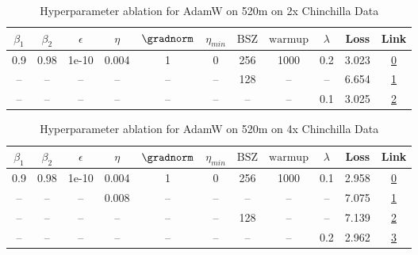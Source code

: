 \begin{table}[H]
\centering
\caption{Hyperparameter ablation for AdamW on 520m on 2x Chinchilla Data}
\label{tab:ablation_adamw_520m_on_2x_chinchilla_data}
\begin{tabular}{ccccccccccc}
\toprule
$\beta_1$ & $\beta_2$ & $\epsilon$ & $\eta$ & $\gradnorm$ & $\eta_{min}$ & $\mathrm{BSZ}$ & $\mathrm{warmup}$ & $\lambda$ & Loss & Link \\
\midrule
0.9 & 0.98 & 1e-10 & 0.004 & 1 & 0 & 256 & 1000 & 0.2 & 3.023 & \href{https://wandb.ai/stanford-mercury/optimizer-scaling/runs/sweep-520m-21B-adamws9d215dlr0.004-wd0.2-minlr0-warmup1000-b10.9-d16851}{0} \\
\midrule
-- & -- & -- & -- & -- & -- & 128 & -- & -- & 6.654 & \href{https://wandb.ai/stanford-mercury/optimizer-scaling/runs/sweep-520m-21B-adamwsffc6bdlr0.004-wd0.2-minlr0-warmup1000-b10.9-646b5d}{1} \\
-- & -- & -- & -- & -- & -- & -- & -- & 0.1 & 3.025 & \href{https://wandb.ai/stanford-mercury/optimizer-scaling/runs/sweep-520m-21B-adamws529f50lr0.004-wd0.1-minlr0-warmup1000-b10.9-c43fcb}{2} \\
\bottomrule
\end{tabular}
\end{table}

\begin{table}[H]
\centering
\caption{Hyperparameter ablation for AdamW on 520m on 4x Chinchilla Data}
\label{tab:ablation_adamw_520m_on_4x_chinchilla_data}
\begin{tabular}{ccccccccccc}
\toprule
$\beta_1$ & $\beta_2$ & $\epsilon$ & $\eta$ & $\gradnorm$ & $\eta_{min}$ & $\mathrm{BSZ}$ & $\mathrm{warmup}$ & $\lambda$ & Loss & Link \\
\midrule
0.9 & 0.98 & 1e-10 & 0.004 & 1 & 0 & 256 & 1000 & 0.1 & 2.958 & \href{https://wandb.ai/stanford-mercury/optimizer-scaling/runs/sweep-520m-42B-adamwbc2b89lr0.004-wd0.1-minlr0-warmup1000-b10.9--50dbd9}{0} \\
\midrule
-- & -- & -- & 0.008 & -- & -- & -- & -- & -- & 7.075 & \href{https://wandb.ai/stanford-mercury/optimizer-scaling/runs/sweep-520m-42B-adamwf6bfb1lr0.008-wd0.1-minlr0-warmup1000-b10.9--c0b516}{1} \\
-- & -- & -- & -- & -- & -- & 128 & -- & -- & 7.139 & \href{https://wandb.ai/stanford-mercury/optimizer-scaling/runs/sweep-520m-42B-adamwf14f39lr0.004-wd0.1-minlr0-warmup1000-b10.9--48b1c7}{2} \\
-- & -- & -- & -- & -- & -- & -- & -- & 0.2 & 2.962 & \href{https://wandb.ai/stanford-mercury/optimizer-scaling/runs/sweep-520m-42B-adamwffc6bdlr0.004-wd0.2-minlr0-warmup1000-b10.9--69bc03}{3} \\
\bottomrule
\end{tabular}
\end{table}

